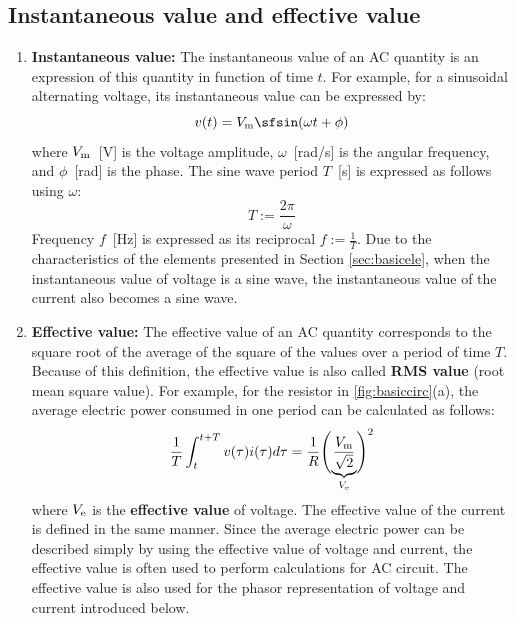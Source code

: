 \documentclass[graybox, envcountchap]{svmult}
\begin{document}
\subsection{Instantaneous value and effective value}

\smallskip
\begin{enumerate}[label=(\alph*)]
  \item \textbf{Instantaneous value:} The instantaneous value of an AC quantity
  is an expression of this quantity in function of time $t$. For example, for a
  sinusoidal alternating voltage, its instantaneous value can be expressed by:
  \begin{equation}\label{eq:acvolt}
    v(t) = V_{\rm m} \sfsin (\omega t + \phi)
  \end{equation}
  where $V_{\rm m}$~[V] is the voltage amplitude, $\omega$~[rad/s] is the
  angular frequency, and $\phi$~[rad] is the phase. The sine wave period
  $T$~[s] is expressed as follows using $\omega$:
  \begin{equation}
    T:=\frac{2\pi}{\omega}
  \end{equation}
  Frequency $f$~[Hz] is expressed as its reciprocal $f:=\tfrac{1}{T}$. Due to
  the characteristics of the elements presented in Section \ref{sec:basicele},
  when the instantaneous value of voltage is a sine wave, the instantaneous
  value of the current also becomes a sine wave.
  \bigskip
  \item \textbf{Effective value:} The effective value of an AC quantity
  corresponds to the square root of the average of the square of the values over
  a period of time $T$. Because of this definition, the effective value is also
  called \textbf{RMS value} (root mean square value). For example, for the
  resistor in \ref{fig:basiccirc}(a), the average electric power consumed in one
  period can be calculated as follows:
  \begin{equation}\label{eq:efP}
    \frac{1}{T}
    \int_{t}^{t+T} v(\tau) i(\tau) d\tau = 
    \frac{1}{R}
    \Biggl( \underbrace{\frac{V_{\rm m}}{\sqrt{2}} }_{V_{\rm e}} \Biggr)^2
  \end{equation}
  where $V_{\rm e}$ is the \textbf{effective value} of voltage. The effective
  value of the current is defined in the same manner. Since the average electric
  power can be described simply by using the effective value of voltage and
  current, the effective value is often used to perform calculations for AC
  circuit. The effective value is also used for the phasor representation of
  voltage and current introduced below.
\end{enumerate}
\end{document}
